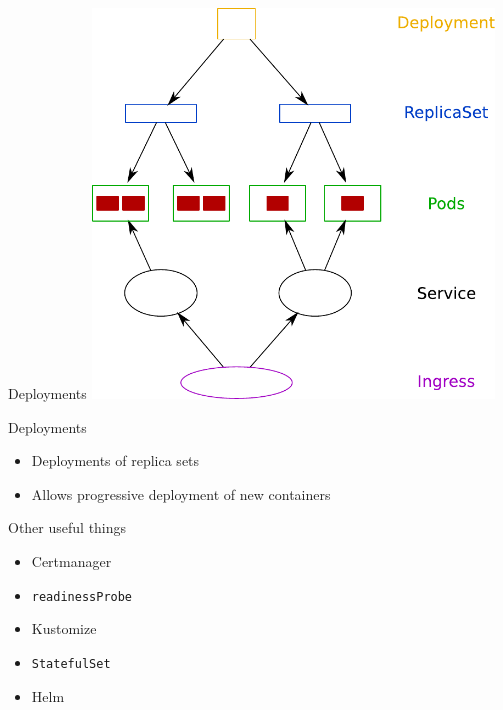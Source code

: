 \documentclass{dcpresentation}
\begin{document}
 
 \begin{frame}{Deployments}
  \centering
  \includegraphics[width=0.8\textwidth]{img/arch-psird.pdf}
 \end{frame}

 \begin{frame}{Deployments}
  \begin{itemize}
   \item Deployments of replica sets
   \item Allows progressive deployment of new containers
  \end{itemize}
 \end{frame}
 
 \begin{frame}{Other useful things}
  \begin{itemize}
   \item Certmanager
   \item \texttt{readinessProbe}
   \item Kustomize
   \item \texttt{StatefulSet}
   \item Helm
  \end{itemize}
 \end{frame}
\end{document}
